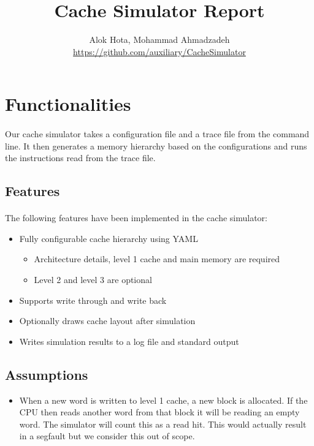 \documentclass[11pt]{article}
\title{\textbf{Cache Simulator Report}}
\author{Alok Hota, Mohammad Ahmadzadeh\\\href{https://github.com/auxiliary/CacheSimulator}{https://github.com/auxiliary/CacheSimulator}}
\begin{document}
\maketitle

\section{Functionalities}
\paragraph{}
Our cache simulator takes a configuration file and a trace file from the command line. It then generates a memory hierarchy based on the configurations and runs the instructions read from the trace file. 

\subsection{Features}
\paragraph{}
The following features have been implemented in the cache simulator:
\begin{itemize}
	\item Fully configurable cache hierarchy using YAML
		\begin{itemize}
			\item Architecture details, level 1 cache and main memory are required
			\item Level 2 and level 3 are optional
		\end{itemize}
	\item Supports write through and write back
	\item Optionally draws cache layout after simulation
	\item Writes simulation results to a log file and standard output
\end{itemize}

\subsection{Assumptions}
\begin{itemize}
	\item When a new word is written to level 1 cache, a new block is allocated. If the CPU then reads another word from that block it will be reading an empty word. The simulator will count this as a read hit. This would actually result in a segfault but we consider this out of scope. 
\end{itemize}
\end{document}
